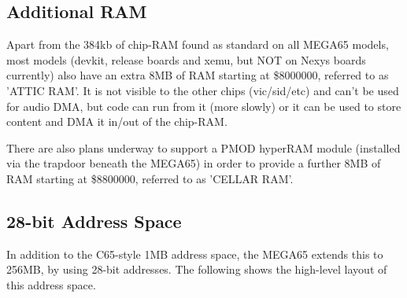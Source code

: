 \subsection{Additional RAM}

Apart from the 384kb of chip-RAM found as standard on all MEGA65 models, most models (devkit, release boards and xemu, but NOT on Nexys boards currently) also have an extra 8MB of RAM starting at \$8000000, referred to as 'ATTIC RAM'. It is not visible to the other chips (vic/sid/etc) and can't be used for audio DMA, but code can run from it (more slowly) or it can be used to store content and DMA it in/out of the chip-RAM.

There are also plans underway to support a PMOD hyperRAM module (installed via the trapdoor beneath the MEGA65) in order to provide a further 8MB of RAM starting at \$8800000, referred to as 'CELLAR RAM'.

\subsection{28-bit Address Space}

In addition to the C65-style 1MB address space, the MEGA65 extends this
to 256MB, by using 28-bit addresses.  The following shows the high-level
layout of this address space.

